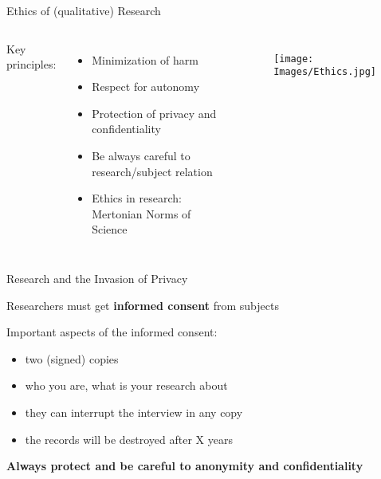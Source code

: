 \documentclass[10pt, aspectratio=169]{beamer}
\begin{document}
\begin{frame}{Ethics of (qualitative) Research}
\begin{columns}
Key principles:
\begin{itemize}
    \item Minimization of harm\vspace{0.3cm}
    \item Respect for autonomy\vspace{0.3cm}
    \item Protection of privacy and confidentiality\vspace{0.3cm}
    \item Be always careful to research/subject relation\vspace{0.3cm}
    \item Ethics in research: Mertonian Norms of Science
\end{itemize}
\begin{figure}
    \centering
    \texttt{[image: Images/Ethics.jpg]}
    \label{fig:ethical-considerations}
\end{figure}
\end{columns}
\end{frame}

\begin{frame}{Research and the Invasion of Privacy}
\begin{center}
Researchers must get \textbf{informed consent} from subjects \\    
\end{center}
\vspace{0.3cm}
Important aspects of the informed consent:    
    \begin{itemize}
        \item two (signed) copies\vspace{0.3cm}
        \item who you are, what is your research about\vspace{0.3cm}
        \item they can interrupt the interview in any copy\vspace{0.3cm}
        \item the records will be destroyed after X years\vspace{0.3cm}
    \end{itemize}
\begin{center}
    \textbf{Always protect and be careful to anonymity and confidentiality}
\end{center}
\end{frame}
\end{document}
